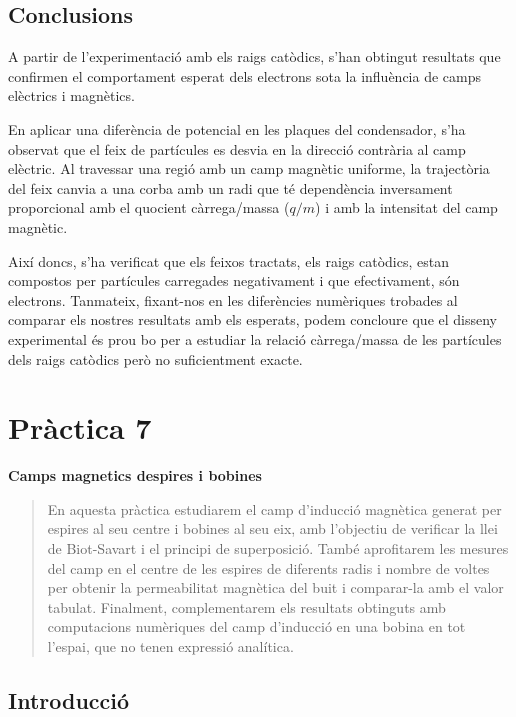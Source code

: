 \documentclass[11pt]{article}
\numberwithin{equation}{section}
\numberwithin{figure}{section}
\numberwithin{table}{section}
\begin{document}
\subsection{Conclusions}
A partir de l'experimentació amb els raigs catòdics, s'han obtingut resultats que confirmen el comportament esperat dels electrons sota la influència de camps elèctrics i magnètics. 
    
En aplicar una diferència de potencial en les plaques del condensador, s'ha observat que el feix de partícules es desvia en la direcció contrària al camp elèctric. Al travessar una regió amb un camp magnètic uniforme, la trajectòria del feix canvia a una corba amb un radi que té dependència inversament proporcional amb el quocient càrrega/massa ($q/m$) i amb la intensitat del camp magnètic. 

Així doncs, s'ha verificat que els feixos tractats, els raigs catòdics, estan compostos per partícules carregades negativament i que efectivament, són electrons. Tanmateix, fixant-nos en les diferències numèriques trobades al comparar els nostres resultats amb els esperats, podem concloure que el disseny experimental és prou bo per a estudiar la relació càrrega/massa de les partícules dels raigs catòdics però no suficientment exacte. 

\newpage

\section{\huge{\textbf{Pràctica 7}}} \label{sec: pràctica 7}

\vspace{.5em}  %

{\Huge \textbf{Camps magnetics despires i bobines}}  %

\begin{abstract}
En aquesta pràctica estudiarem el camp d'inducció magnètica generat per espires al seu centre i bobines al seu eix, amb l'objectiu de verificar la llei de Biot-Savart i el principi de superposició. També aprofitarem les mesures del camp en el centre de les espires de diferents radis i nombre de voltes per obtenir la permeabilitat magnètica del buit i comparar-la amb el valor tabulat. Finalment, complementarem els resultats obtinguts amb computacions numèriques del camp d'inducció en una bobina en tot l'espai, que no tenen expressió analítica.
\end{abstract}


\subsection{Introducció}\label{sec: intro}
\end{document}
